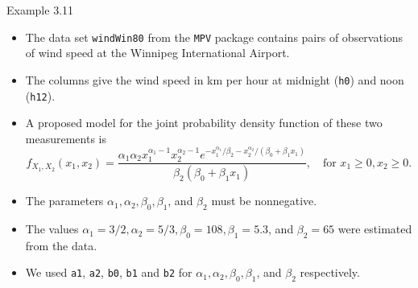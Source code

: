 \documentclass[
  9pt,
  a4paper,
  ignorenonframetext,
  notheorems]{beamer}
\begin{document}
\begin{frame}[fragile]
\begin{block}{Example 3.11}
\protect\hypertarget{example-3.11}{}
\begin{itemize}
\item
  The data set \texttt{windWin80} from the \texttt{MPV} package contains
  pairs of observations of wind speed at the Winnipeg International
  Airport.
\item
  The columns give the wind speed in km per hour at midnight
  (\texttt{h0}) and noon (\texttt{h12}).
\item
  A proposed model for the joint probability density function of these
  two measurements is \[
  f_{X_1, X_2}(x_1, x_2) = \frac{\alpha_1 \alpha_2 x_1^{\alpha_1 -1}x_2^{\alpha_2 - 1}e^{-x_1^{\alpha_1}/\beta_2 - x_2^{\alpha_2}/(\beta_0 + \beta_1 x_1)}}{\beta_2 (\beta_0 + \beta_1 x_1)}, \quad{} \text{for } x_1 \geq 0, x_2 \geq 0.
  \]
\item
  The parameters \(\alpha_1,\alpha_2,\beta_0,\beta_1\), and \(\beta_2\)
  must be nonnegative.
\item
  The values
  \(\alpha_1 = 3/2,\alpha_2 = 5/3,\beta_0 = 108,\beta_1 = 5.3\), and
  \(\beta_2 = 65\) were estimated from the data.
\item
  We used \texttt{a1}, \texttt{a2}, \texttt{b0}, \texttt{b1} and
  \texttt{b2} for \(\alpha_1,\alpha_2,\beta_0,\beta_1\), and \(\beta_2\)
  respectively.
\end{itemize}


\end{block}
\end{frame}
\end{document}
